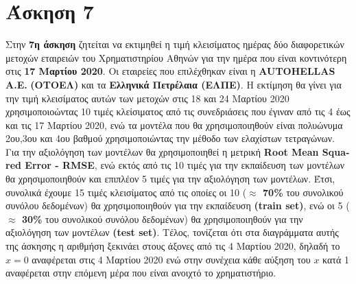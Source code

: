 \documentclass[Second Project.tex]{subfiles}
\begin{document}
\section{ Άσκηση 7 }
Στην \textbf{7η άσκηση} ζητείται να εκτιμηθεί η τιμή κλεισίματος ημέρας δύο διαφορετικών μετοχών εταιρειών του
Χρηματιστηρίου Αθηνών για την ημέρα που είναι κοντινότερη στις \textbf{17 Μαρτίου 2020}. Οι εταιρείες που 
επιλέχθηκαν είναι η \textlatin{\textbf{AUTOHELLAS A.E.}} \textbf{(ΟΤΟΕΛ)} και τα 
\textbf{Ελληνικά Πετρέλαια (ΕΛΠΕ)}. Η εκτίμηση θα γίνει για την τιμή κλεισίματος αυτών των μετοχών στις
18 και 24 Μαρτίου 2020 χρησιμοποιοώντας 10 τιμές κλείσιματος από τις συνεδριάσεις που έγιναν από τις 4 έως και τις
17 Μαρτίου 2020, ενώ τα μοντέλα που θα χρησιμοποιηθούν είναι πολυώνυμα 2ου,3ου και 4ου βαθμού χρησιμοποιώντας
την μέθοδο των ελαχίστων τετραγώνων. Για την αξιολόγηση των μοντέλων θα χρησιμοποιηθεί η μετρική 
\textlatin{\textbf{Root Mean Squared Error - RMSE}}, ενώ εκτός από τις 10 τιμές για την εκπαίδευση των μοντέλων
θα χρησιμοποιηθούν και επιπλέον 5 τιμές για την αξιολόγηση των μοντέλων. Έτσι, συνολικά έχουμε 15 τιμές 
κλεισίματος από τις οποίες οι 10 (\textbf{$\approx$ 70\%} του συνολικού συνόλου δεδομένων) θα χρησιμοποιηθούν για την 
εκπαίδευση \textlatin{\textbf{(train set)}}, ενώ οι 5 (\textbf{$\approx$ 30\%} του συνολικού συνόλου δεδομένων) θα 
χρησιμοποιηθούν για την αξιολόγηση των μοντέλων \textlatin{\textbf{(test set)}}. Τέλος, τονίζεται ότι στα 
διαγράμματα αυτής της άσκησης η αριθμήση ξεκινάει στους άξονες από τις 4 Μαρτίου 2020, δηλαδή το $x=0$ 
αναφέρεται στις 4 Μαρτίου 2020 ενώ στην συνέχεια κάθε αύξηση του $x$ κατά 1 αναφέρεται στην επόμενη μέρα που
είναι ανοιχτό το χρηματιστήριο.
\end{document}
